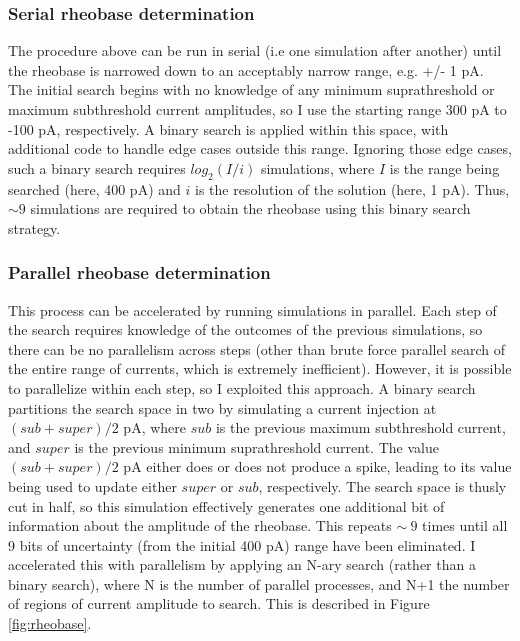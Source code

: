 \subsubsection{Serial rheobase determination}
The procedure above can be run in serial (i.e one simulation after another) until the rheobase is narrowed down to an acceptably narrow range, e.g. +/- 1 pA.
The initial search begins with no knowledge of any minimum suprathreshold or maximum subthreshold current amplitudes, so I use the starting range 300 pA to -100 pA, respectively.
A binary search is applied within this space, with additional code to handle edge cases outside this range.
Ignoring those edge cases, such a binary search requires $log_2(I/i)$ simulations, where $I$ is the range being searched (here, 400 pA) and $i$ is the resolution of the solution (here, 1 pA).
Thus, $\sim9$ simulations are required to obtain the rheobase using this binary search strategy.

\subsubsection{Parallel rheobase determination}
This process can be accelerated by running simulations in parallel.
Each step of the search requires knowledge of the outcomes of the previous simulations, so there can be no parallelism across steps (other than brute force parallel search of the entire range of currents, which is extremely inefficient).
However, it is possible to parallelize within each step, so I exploited this approach.
A binary search partitions the search space in two by simulating a current injection at $(sub+super)/2$ pA, where $sub$ is the previous maximum subthreshold current, and $super$ is the previous minimum suprathreshold current.
The value $(sub+super)/2$ pA either does or does not produce a spike, leading to its value being used to update either $super$ or $sub$, respectively.
The search space is thusly cut in half, so this simulation effectively generates one additional bit of information about the amplitude of the rheobase.
This repeats $\sim~9$ times until all 9 bits of uncertainty (from the initial 400 pA) range have been eliminated.
I accelerated this with parallelism by applying an N-ary search (rather than a binary search), where N is the number of parallel processes, and N+1 the number of regions of current amplitude to search.
This is described in Figure \ref{fig:rheobase}.

